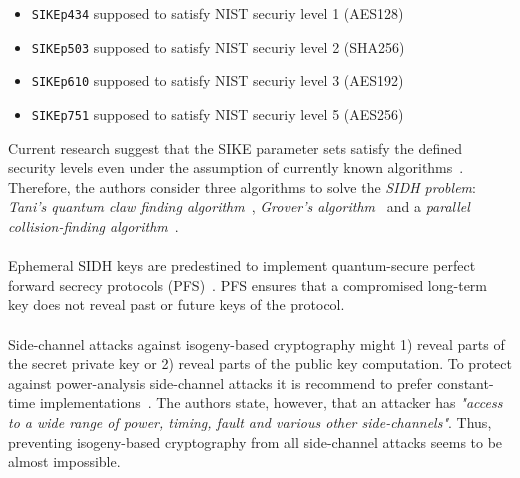 \begin{itemize}
\itemsep0em 
	\item \texttt{SIKEp434} supposed to satisfy NIST securiy level 1 (AES128)
	\item \texttt{SIKEp503} supposed to satisfy NIST securiy level 2 (SHA256)
	\item \texttt{SIKEp610} supposed to satisfy NIST securiy level 3 (AES192)
	\item \texttt{SIKEp751} supposed to satisfy NIST securiy level 5 (AES256)
\end{itemize}
Current research suggest that the SIKE parameter sets satisfy the defined security levels even under the assumption of currently known algorithms~\parencite{jaques2019quantum}. Therefore, the authors consider three algorithms to solve the \textit{\gls{SIDH} problem}: \textit{Tani's quantum claw finding algorithm}~\parencite{tani2009claw}, \textit{Grover's algorithm}~\parencite{grover1996fast} and a \textit{parallel collision-finding algorithm}~\parencite{van1999parallel}.
\\\\
Ephemeral \gls{SIDH} keys are predestined to implement quantum-secure perfect forward secrecy protocols (\gls{PFS})~\parencite{koziel2018high}. \gls{PFS} ensures that a compromised long-term key does not reveal past or future keys of the protocol.
\\\\
Side-channel attacks against isogeny-based cryptography might 1) reveal parts of the secret private key or 2) reveal parts of the public key computation. To protect against power-analysis side-channel attacks it is recommend to prefer constant-time implementations~\parencite{sike2020spec}. The authors state, however, that an attacker has \textit{"access to a wide range of power, timing, fault and various other side-channels"}. Thus, preventing isogeny-based cryptography from all side-channel attacks seems to be almost impossible.
